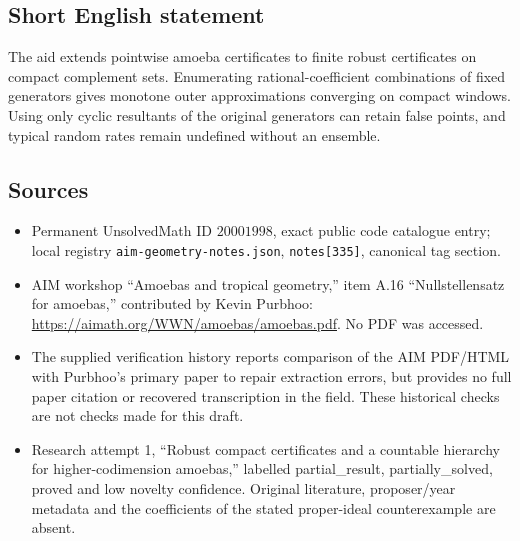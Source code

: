 \documentclass[11pt]{article}
\begin{document}
\subsection{Short English statement}
The aid extends pointwise amoeba certificates to finite robust certificates on compact complement sets. Enumerating rational-coefficient combinations of fixed generators gives monotone outer approximations converging on compact windows. Using only cyclic resultants of the original generators can retain false points, and typical random rates remain undefined without an ensemble.
\subsection{Sources}
\begin{itemize}
\item Permanent UnsolvedMath ID \(20001998\), exact public code catalogue entry; local registry \texttt{aim-geometry-notes.json}, \texttt{notes[335]}, canonical tag section.
\item AIM workshop ``Amoebas and tropical geometry,'' item A.16 ``Nullstellensatz for amoebas,'' contributed by Kevin Purbhoo: \url{https://aimath.org/WWN/amoebas/amoebas.pdf}. No PDF was accessed.
\item The supplied verification history reports comparison of the AIM PDF/HTML with Purbhoo's primary paper to repair extraction errors, but provides no full paper citation or recovered transcription in the field. These historical checks are not checks made for this draft.
\item Research attempt 1, ``Robust compact certificates and a countable hierarchy for higher-codimension amoebas,'' labelled partial\_result, partially\_solved, proved and low novelty confidence. Original literature, proposer/year metadata and the coefficients of the stated proper-ideal counterexample are absent.
\end{itemize}
\end{document}
